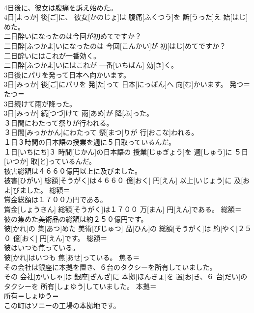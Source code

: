 \documentclass[8pt]{extreport}
\begin{document}
\begin{CJK}{UTF8}{min}
\\	4日後に、彼女は腹痛を訴え始めた。	
\\	4日[よっか] 後[ご]に、 彼女[かのじょ]は 腹痛[ふくつう]を 訴[うった]え 始[はじ]めた。	
\\	二日酔いになったのは今回が初めてですか？	
\\	二日酔[ふつかよ]いになったのは 今回[こんかい]が 初[はじ]めてですか？	
\\	二日酔いにはこれが一番効く。	
\\	二日酔[ふつかよ]いにはこれが 一番[いちばん] 効[き]く。	
\\	3日後にパリを発って日本へ向かいます。	
\\	3日[みっか] 後[ご]にパリを 発[た]って 日本[にっぽん]へ 向[む]かいます。	発つ＝たつ＝ 
\\	3日続けて雨が降った。	
\\	3日[みっか] 続[つづ]けて 雨[あめ]が 降[ふ]った。	
\\	３日間にわたって祭りが行われる。	
\\	３日間[みっかかん]にわたって 祭[まつ]りが 行[おこな]われる。	
\\	１日３時間の日本語の授業を週に５日取っているんだ。	
\\	１日[いちにち]３ 時間[じかん]の日本語の 授業[じゅぎょう]を 週[しゅう]に ５日[いつか] 取[と]っているんだ。	
\\	被害総額は４６６０億円以上に及びました。	
\\	被害[ひがい] 総額[そうがく]は４６６０ 億[おく] 円[えん] 以上[いじょう]に 及[およ]びました。	総額＝ 
\\	賞金総額は１７００万円である。	
\\	賞金[しょうきん] 総額[そうがく]は１７００ 万[まん] 円[えん]である。	総額＝ 
\\	彼の集めた美術品の総額は約２５０億円です。	
\\	彼[かれ]の 集[あつ]めた 美術[びじゅつ] 品[ひん]の 総額[そうがく]は 約[やく]２５０ 億[おく] 円[えん]です。	総額＝ 
\\	彼はいつも焦っている。	
\\	彼[かれ]はいつも 焦[あせ]っている。	焦る＝ 
\\	その会社は銀座に本拠を置き、６台のタクシーを所有していました。	
\\	その 会社[かいしゃ]は 銀座[ぎんざ]に 本拠[ほんきょ]を 置[お]き、６ 台[だい]のタクシーを 所有[しょゆう]していました。	本拠＝ 
\\	所有＝しょゆう＝ 
\\	この町はソニーの工場の本拠地です。	

\end{CJK}
\end{document}
